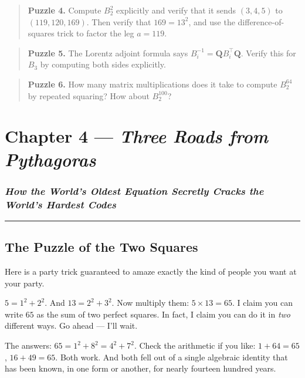 \documentclass[12pt, letterpaper, openany]{book}
\theoremstyle{definition}
\theoremstyle{remark}
\begin{document}
\begin{quote}
\textbf{Puzzle 4.} Compute $B_2^2$ explicitly and verify that it sends $(3, 4, 5)$ to $(119, 120, 169)$. Then verify that $169 = 13^2$, and use the difference-of-squares trick to factor the leg $a = 119$.
\end{quote}



\begin{quote}
\textbf{Puzzle 5.} The Lorentz adjoint formula says $B_i^{-1} = \mathbf{Q} B_i^\top \mathbf{Q}$. Verify this for $B_3$ by computing both sides explicitly.
\end{quote}



\begin{quote}
\textbf{Puzzle 6.} How many matrix multiplications does it take to compute $B_2^{64}$ by repeated squaring? How about $B_2^{100}$?
\end{quote}



\clearpage

\chapter{Chapter 4 --- \textit{Three Roads from Pythagoras}}



\subsection*{\textit{How the World's Oldest Equation Secretly Cracks the World's Hardest Codes}}



\bigskip\noindent\rule{\textwidth}{0.4pt}\bigskip



\section*{The Puzzle of the Two Squares}


Here is a party trick guaranteed to amaze exactly the kind of people you want at your party.

$5 = 1^2 + 2^2$. And $13 = 2^2 + 3^2$. Now multiply them: $5 \times 13 = 65$. I claim you can write $65$ as the sum of two perfect squares. In fact, I claim you can do it in \textit{two} different ways. Go ahead --- I'll wait.

The answers: $65 = 1^2 + 8^2 = 4^2 + 7^2$. Check the arithmetic if you like: $1 + 64 = 65$, $16 + 49 = 65$. Both work. And both fell out of a single algebraic identity that has been known, in one form or another, for nearly fourteen hundred years.
\end{document}
